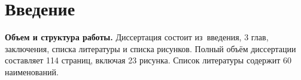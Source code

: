 \chapter*{Введение}                         %

\newcommand{\actuality}{{\textbf\actualityTXT}}
\newcommand{\progress}{}
\newcommand{\aim}{{\textbf\aimTXT}}
\newcommand{\tasks}{\textbf{\tasksTXT}}
\newcommand{\novelty}{\textbf{\noveltyTXT}}
\newcommand{\influence}{\textbf{\influenceTXT}}
\newcommand{\methods}{\textbf{\methodsTXT}}
\newcommand{\defpositions}{\textbf{\defpositionsTXT}}
\newcommand{\reliability}{\textbf{\reliabilityTXT}}
\newcommand{\probation}{\textbf{\probationTXT}}
\newcommand{\contribution}{\textbf{\contributionTXT}}
\newcommand{\publications}{\textbf{\publicationsTXT}}




\textbf{Объем и структура работы.} 
Диссертация состоит из~введения, 
3 глав, заключения, списка литературы и списка рисунков.
Полный объём диссертации составляет
114 страниц, включая
23 рисунка.
Список литературы содержит
60 наименований.


